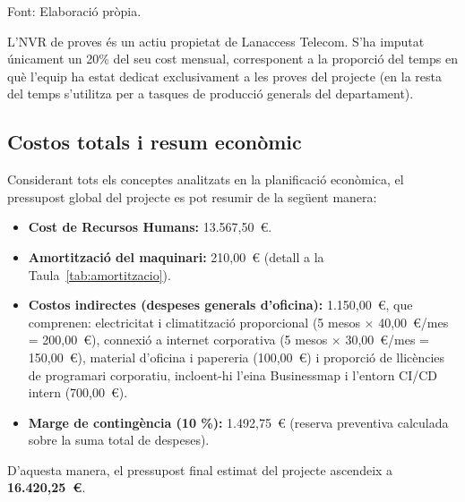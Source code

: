 \begin{table}[htbp]
  \centering
  \caption{Càlcul de l'amortització del maquinari del projecte.}
  \label{tab:amortitzacio}
  \par\smallskip
  \small Font: Elaboració pròpia.
\end{table}

L'NVR de proves és un actiu propietat de Lanaccess Telecom. S'ha imputat únicament un 20\% del seu cost mensual, corresponent a la proporció del temps en què l'equip ha estat dedicat exclusivament a les proves del projecte (en la resta del temps s'utilitza per a tasques de producció generals del departament).

\subsection{Costos totals i resum econòmic}
Considerant tots els conceptes analitzats en la planificació econòmica, el pressupost global del projecte es pot resumir de la següent manera:
\begin{itemize}
  \item \textbf{Cost de Recursos Humans:} 13.567,50~\euro{}.
  \item \textbf{Amortització del maquinari:} 210,00~\euro{} (detall a la Taula~\ref{tab:amortitzacio}).
  \item \textbf{Costos indirectes (despeses generals d'oficina):} 1.150,00~\euro{}, que comprenen: electricitat i climatització proporcional (5 mesos $\times$ 40,00~\euro{}/mes = 200,00~\euro{}), connexió a internet corporativa (5 mesos $\times$ 30,00~\euro{}/mes = 150,00~\euro{}), material d'oficina i papereria (100,00~\euro{}) i proporció de llicències de programari corporatiu, incloent-hi l'eina Businessmap i l'entorn CI/CD intern (700,00~\euro{}).
  \item \textbf{Marge de contingència (10 \%):} 1.492,75~\euro{} (reserva preventiva calculada sobre la suma total de despeses).
\end{itemize}
D'aquesta manera, el pressupost final estimat del projecte ascendeix a \textbf{16.420,25~\euro{}}.

